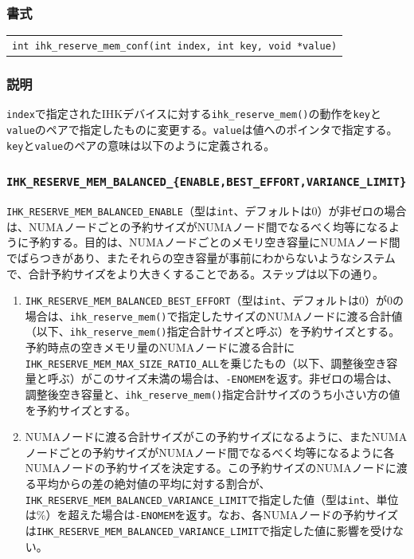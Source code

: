 \documentclass[twoside,11pt,fleqn]{book}
\begin{document}
\subsubsection*{書式}
\begin{tabular}[t]{@{}l@{}}
{\quad} \texttt{int ihk\_reserve\_mem\_conf(int index, int key, void *value)}\\
\end{tabular}
\subsubsection*{説明}{\quad} \texttt{index}で指定されたIHKデバイスに対する\texttt{ihk\_reserve\_mem()}の動作を\texttt{key}と\texttt{value}のペアで指定したものに変更する。\texttt{value}は値へのポインタで指定する。\texttt{key}と\texttt{value}のペアの意味は以下のように定義される。

\subsubsection*{\texttt{IHK\_RESERVE\_MEM\_BALANCED\_\{ENABLE,BEST\_EFFORT,VARIANCE\_LIMIT\}}}
\verb|IHK_RESERVE_MEM_BALANCED_ENABLE|（型は\verb|int|、デフォルトは0）が非ゼロの場合は、NUMAノードごとの予約サイズがNUMAノード間でなるべく均等になるように予約する。目的は、NUMAノードごとのメモリ空き容量にNUMAノード間でばらつきがあり、またそれらの空き容量が事前にわからないようなシステムで、合計予約サイズをより大きくすることである。ステップは以下の通り。
\begin{enumerate}
\item \verb|IHK_RESERVE_MEM_BALANCED_BEST_EFFORT|（型は\verb|int|、デフォルトは0）が0の場合は、\verb|ihk_reserve_mem()|で指定したサイズのNUMAノードに渡る合計値（以下、\verb|ihk_reserve_mem()|指定合計サイズと呼ぶ）を予約サイズとする。予約時点の空きメモリ量のNUMAノードに渡る合計に\texttt{IHK\_RESERVE\_MEM\_MAX\_SIZE\_RATIO\_ALL}を乗じたもの（以下、調整後空き容量と呼ぶ）がこのサイズ未満の場合は、\texttt{-ENOMEM}を返す。非ゼロの場合は、調整後空き容量と、\verb|ihk_reserve_mem()|指定合計サイズのうち小さい方の値を予約サイズとする。
\item NUMAノードに渡る合計サイズがこの予約サイズになるように、またNUMAノードごとの予約サイズがNUMAノード間でなるべく均等になるように各NUMAノードの予約サイズを決定する。この予約サイズのNUMAノードに渡る平均からの差の絶対値の平均に対する割合が、\verb|IHK_RESERVE_MEM_BALANCED_VARIANCE_LIMIT|で指定した値（型は\verb|int|、単位は\%）を超えた場合は\texttt{-ENOMEM}を返す。なお、各NUMAノードの予約サイズは\verb|IHK_RESERVE_MEM_BALANCED_VARIANCE_LIMIT|で指定した値に影響を受けない。
\end{enumerate}
\end{document}
